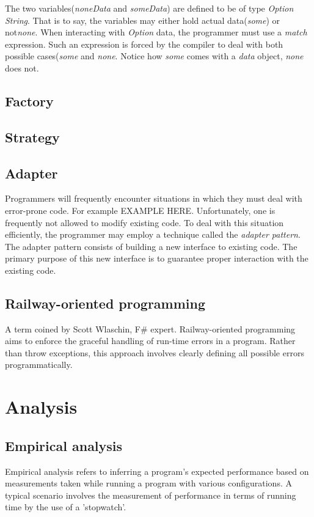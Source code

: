 \documentclass{article}
\begin{document}
The two variables({\em noneData} and {\em someData}) are defined to be of type {\em Option String}.
That is to say, the variables may either hold actual data({\em some}) or not{\em none}.
When interacting with {\em Option} data, the programmer must use a {\em match} expression.
Such an expression is forced by the compiler to deal with both possible cases({\em some} and {\em none}.
Notice how {\em some} comes with a {\em data} object, {\em none} does not.

\subsection{Factory}
\subsection{Strategy}

\subsection{Adapter}
Programmers will frequently encounter situations in which they must deal with error-prone code.
For example {\huge EXAMPLE HERE}.
Unfortunately, one is frequently not allowed to modify existing code.
To deal with this situation efficiently, the programmer may employ a technique called the {\em adapter pattern}.
The adapter pattern consists of building a new interface to existing code.
The primary purpose of this new interface is to guarantee proper interaction with the existing code.

\subsection{Railway-oriented programming}
A term coined by Scott Wlaschin, F\# expert.
Railway-oriented programming aims to enforce the graceful handling of run-time errors in a program.
Rather than throw exceptions, this approach involves clearly defining all possible errors programmatically.

\newpage

\section{Analysis}
\subsection{Empirical analysis}
Empirical analysis refers to inferring a program's expected performance based on measurements taken while running a program with various configurations.
A typical scenario involves the measurement of performance in terms of running time by the use of a 'stopwatch'.
\end{document}
